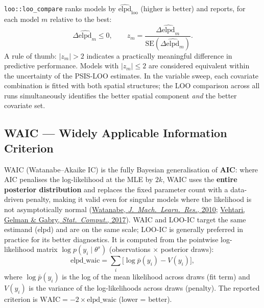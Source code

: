 \documentclass[12pt,a4paper]{article}
\begin{document}
\texttt{loo::loo\_compare} ranks models by $\widehat{\text{elpd}}_{\text{loo}}$ (higher is better)
and reports, for each model $m$ relative to the best:
\begin{equation}
  \Delta\widehat{\text{elpd}}_m \leq 0,
  \qquad
  z_m = \frac{\Delta\widehat{\text{elpd}}_m}{\text{SE}(\Delta\widehat{\text{elpd}}_m)}.
\end{equation}
A rule of thumb: $|z_m| > 2$ indicates a practically meaningful difference in predictive
performance. Models with $|z_m| \leq 2$ are considered equivalent within the uncertainty of
the PSIS-LOO estimates. In the variable sweep, each covariate combination is fitted with both
spatial structures; the LOO comparison across all runs simultaneously identifies the better
spatial component \emph{and} the better covariate set.

\subsection{WAIC --- Widely Applicable Information Criterion}

WAIC (Watanabe--Akaike IC) is the fully Bayesian generalisation of \textbf{AIC}: where AIC penalises the log-likelihood at the MLE by $2k$, WAIC uses the \textbf{entire posterior distribution} and replaces the fixed parameter count with a data-driven penalty, making it valid even for singular models where the likelihood is not asymptotically normal
(\href{https://jmlr.org/papers/v11/watanabe10a.html}{Watanabe, \textit{J.\ Mach.\ Learn.\ Res.}, 2010};
\href{https://doi.org/10.1007/s11222-016-9696-4}{Vehtari, Gelman \& Gabry, \textit{Stat.\ Comput.}, 2017}).
WAIC and LOO-IC target the same estimand (elpd) and are on the same scale; LOO-IC is generally preferred in practice for its better diagnostics.
It is computed from the pointwise log-likelihood matrix $\log p(y_i \mid \theta^s)$ (observations $\times$ posterior draws):
\begin{equation}
  \text{elpd\_waic} = \sum_i \bigl[\log \bar{p}(y_i) - V(y_i)\bigr],
\end{equation}
where $\log \bar{p}(y_i)$ is the log of the mean likelihood across draws (fit term) and $V(y_i)$ is the variance of the log-likelihoods across draws (penalty). The reported criterion is $\text{WAIC} = -2 \times \text{elpd\_waic}$ (lower = better).
\end{document}
